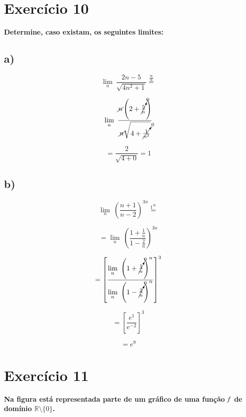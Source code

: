 \documentclass{article}
\begin{document}

\section*{Exercício 10}\textbf{Determine, caso existam, os seguintes limites:}
\subsection*{a)}
\[\lim\limits_{n}\ \frac{2n-5}{\sqrt{4n^2+1}}\overset{\mathrm{\frac{\infty}{\infty}}}{=}\]


\[\lim\limits_{n}\ \frac{\cancel{n}\left(2+\cancelto{0}{\frac{5}{n}}\right)}{\cancel{n}\sqrt{4+\cancelto{0}{\frac{1}{n^2}}}}\]

\[= \frac{2}{\sqrt{4+0}}=1\]

\subsection*{b)}
\[\lim\limits_{n}\ \left(\frac{n+1}{n-2}\right)^{3n}\overset{\mathrm{1^{\infty}}}{=}\]

\[=\lim\limits_{n}\ \left(\frac{1+\frac{1}{n}}{1-\frac{2}{n}}\right)^{3n}\]

\[=\left[\frac{\lim\limits_{n}\ \left(1+\cancelto{0}{\frac{1}{n}}\right)^n}{\lim\limits_{n}\ \left(1-\cancelto{0}{\frac{2}{n}}\right)^n}\right]^{3}\]


\[=\left[\frac{e^{1}}{e^{-2}}\right]^{3}\]

\[=e^{9}\]

\section*{Exercício 11} \textbf{Na figura está representada parte de um gráfico de uma função $\it{f}$ de domínio $\mathbb{R}\setminus\{0\}$.}
\end{document}
